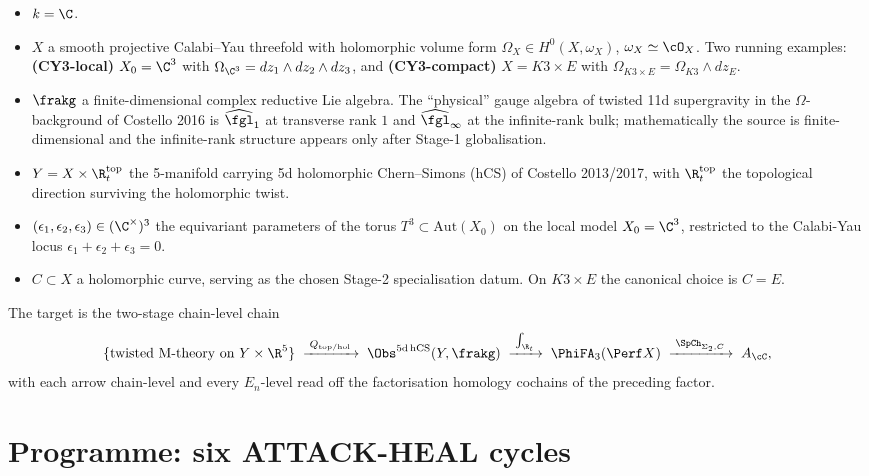 \begin{itemize}
\item $k = \C$.
\item $X$ a smooth projective Calabi--Yau threefold with holomorphic
volume form $\Omega_X \in H^0(X, \omega_X)$, $\omega_X \simeq \cO_X$.
Two running examples: \textbf{(CY3-local)} $X_0 = \C^3$ with
$\Omega_{\C^3} = dz_1 \wedge dz_2 \wedge dz_3$, and
\textbf{(CY3-compact)} $X = K3 \times E$ with
$\Omega_{K3 \times E} = \Omega_{K3} \wedge dz_E$.
\item $\frakg$ a finite-dimensional complex reductive Lie algebra.
The ``physical'' gauge algebra of twisted 11d supergravity in the
$\Omega$-background of Costello 2016 is $\widehat{\fgl}_1$ at
transverse rank $1$ and $\widehat{\fgl}_\infty$ at the infinite-rank
bulk; mathematically the source is finite-dimensional and the
infinite-rank structure appears only after Stage-1 globalisation.
\item $Y = X \times \R_t^{\mathrm{top}}$ the 5-manifold carrying 5d
holomorphic Chern--Simons (hCS) of Costello 2013/2017, with
$\R_t^{\mathrm{top}}$ the topological direction surviving the
holomorphic twist.
\item $(\epsilon_1, \epsilon_2, \epsilon_3) \in (\C^\times)^3$ the
equivariant parameters of the torus $T^3 \subset \mathrm{Aut}(X_0)$
on the local model $X_0 = \C^3$, restricted to the Calabi-Yau
locus $\epsilon_1 + \epsilon_2 + \epsilon_3 = 0$.
\item $C \subset X$ a holomorphic curve, serving as the chosen
Stage-2 specialisation datum. On $K3 \times E$ the canonical choice
is $C = E$.
\end{itemize}

The target is the two-stage chain-level chain
\[
 \{\text{twisted M-theory on } Y \times \R^5\}
 \;\xrightarrow{\;Q_{\mathrm{top/hol}}\;}\;
 \Obs^{5\mathrm{d\,hCS}}(Y, \frakg)
 \;\xrightarrow{\;\int_{\R_t}\;}\;
 \PhiFA_3(\Perf X)
 \;\xrightarrow{\;\SpCh_{\Sigma_2, C}\;}\;
 A_\cC,
\]
with each arrow chain-level and every $E_n$-level read off the
factorisation homology cochains of the preceding factor.

\section*{Programme: six ATTACK-HEAL cycles}


